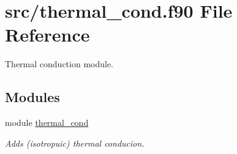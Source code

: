 \hypertarget{thermal__cond_8f90}{}\section{src/thermal\+\_\+cond.f90 File Reference}
\label{thermal__cond_8f90}


Thermal conduction module.  


\subsection*{Modules}
\begin{DoxyCompactItemize}
\item 
module \hyperlink{namespacethermal__cond}{thermal\+\_\+cond}
\begin{DoxyCompactList}\small\item\em Adds (isotropuic) thermal conducion. \end{DoxyCompactList}\end{DoxyCompactItemize}
